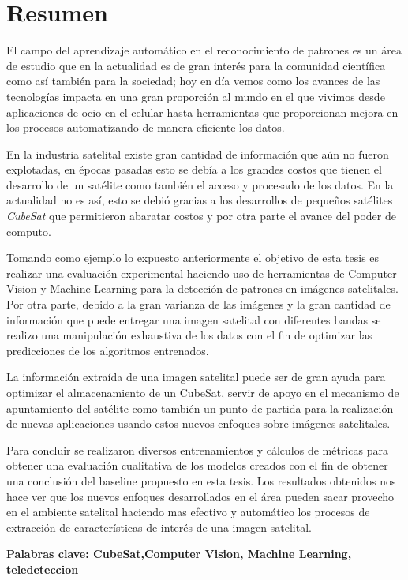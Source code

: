 \chapter*{Resumen}
\label{chap:resumen}

El campo del aprendizaje automático en el reconocimiento de patrones es un área de estudio que en la actualidad es de gran interés para la comunidad científica como así también para la sociedad; hoy en día vemos como los avances de las tecnologías impacta en una gran proporción al mundo en el que vivimos desde aplicaciones de ocio en el celular hasta herramientas que proporcionan mejora en los procesos automatizando de manera eficiente los datos.

En la industria satelital existe gran cantidad de información que aún no fueron explotadas, en épocas pasadas esto se debía a los grandes costos que tienen el desarrollo de un satélite como también el acceso y procesado de los datos. En la actualidad no es así, esto se debió gracias a los desarrollos de pequeños satélites \textit{CubeSat} que permitieron abaratar costos y por otra parte el avance del poder de computo.

Tomando como ejemplo lo expuesto anteriormente el objetivo de esta tesis es realizar una evaluación experimental haciendo uso  de herramientas de Computer Vision y Machine Learning para la detección de patrones en imágenes satelitales. 
Por otra parte, debido a la gran varianza de las imágenes y la gran cantidad de información que puede entregar una imagen satelital con diferentes bandas se realizo una manipulación exhaustiva de los datos con el fin de optimizar las predicciones de los algoritmos entrenados. 

La información extraída de una imagen satelital puede ser de gran ayuda para optimizar el almacenamiento de un CubeSat, servir de apoyo en el mecanismo de apuntamiento del satélite como también un punto de partida para la realización de nuevas aplicaciones usando estos nuevos enfoques sobre imágenes satelitales.

Para concluir se realizaron diversos entrenamientos y cálculos de métricas para obtener una evaluación cualitativa de los modelos creados con el fin de obtener una conclusión del baseline propuesto en esta tesis. Los resultados obtenidos nos hace ver que los nuevos enfoques desarrollados en el área pueden sacar provecho en el ambiente satelital haciendo mas efectivo y automático los procesos de extracción de características de interés de una imagen satelital.

\textbf{Palabras clave: CubeSat,Computer Vision, Machine Learning, teledeteccion}

